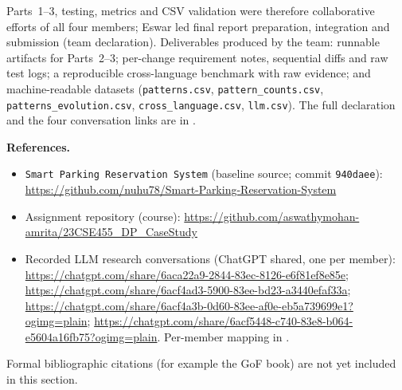 \documentclass[11pt,a4paper]{article}
\begin{document}
\begin{sloppypar}
Parts~1--3, testing, metrics and CSV validation were therefore collaborative
efforts of all four members; Eswar led final report preparation, integration and
submission (team declaration). Deliverables produced by the team: runnable
artifacts for Parts~2--3; per-change requirement notes, sequential diffs and raw
test logs; a reproducible cross-language benchmark with raw evidence; and
machine-readable datasets (\texttt{patterns.csv}, \texttt{pattern\_counts.csv},
\texttt{patterns\_evolution.csv}, \texttt{cross\_language.csv}, \texttt{llm.csv}).
The full declaration and the four conversation links are in
.
\end{sloppypar}

\noindent\textbf{References.}
\begin{sloppypar}
\begin{itemize}
  \item \texttt{Smart Parking Reservation System} (baseline source; commit
        \texttt{940daee}): \url{https://github.com/nuhu78/Smart-Parking-Reservation-System}
  \item Assignment repository (course): \url{https://github.com/aswathymohan-amrita/23CSE455_DP_CaseStudy}
  \item Recorded LLM research conversations (ChatGPT shared, one per member):
        \url{https://chatgpt.com/share/6aca22a9-2844-83ec-8126-e6f81ef8e85e};
        \url{https://chatgpt.com/share/6acf4ad3-5900-83ee-bd23-a3440efaf33a};
        \url{https://chatgpt.com/share/6acf4a3b-0d60-83ee-af0e-eb5a739699e1?ogimg=plain};
        \url{https://chatgpt.com/share/6acf5448-c740-83e8-b064-e5604a16fb75?ogimg=plain}.
        Per-member mapping in .
\end{itemize}
\end{sloppypar}
Formal bibliographic citations (for example the GoF book) are not yet included
in this section.
\end{document}
